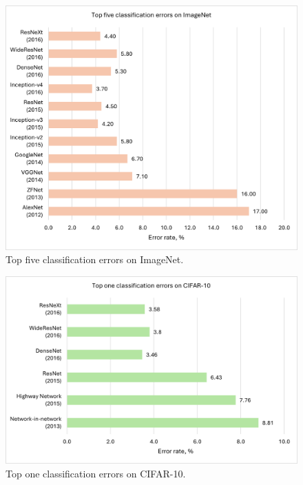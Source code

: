 \documentclass[preprint,12pt]{elsarticle}
\begin{document}
\begin{figure}[h!]
    \centering
    \includegraphics[scale=0.8]{fig_cnn_top_five_errors_imagenet.png}
    \caption{Top five classification errors on ImageNet.}
    \label{fig_cnn_top_five_errors_imagenet}
\end{figure}

\begin{figure}[h!]
    \centering
    \includegraphics[scale=0.8]{fig_cnn_top_one_errors_cifar10.png}
    \caption{Top one classification errors on CIFAR-10.}
    \label{fig_cnn_top_one_errors_cifar10}
\end{figure}


\end{document}
